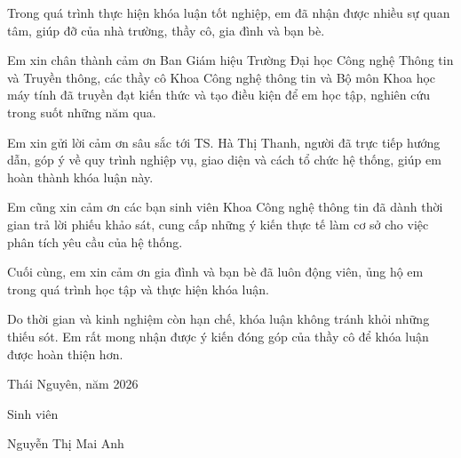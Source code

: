 \documentclass[../main.tex]{subfiles}
\begin{document}

Trong quá trình thực hiện khóa luận tốt nghiệp, em đã nhận được nhiều sự quan tâm, giúp đỡ của nhà trường, thầy cô, gia đình và bạn bè.

Em xin chân thành cảm ơn Ban Giám hiệu Trường Đại học Công nghệ Thông tin và Truyền thông, các thầy cô Khoa Công nghệ thông tin và Bộ môn Khoa học máy tính đã truyền đạt kiến thức và tạo điều kiện để em học tập, nghiên cứu trong suốt những năm qua.

Em xin gửi lời cảm ơn sâu sắc tới TS. Hà Thị Thanh, người đã trực tiếp hướng dẫn, góp ý về quy trình nghiệp vụ, giao diện và cách tổ chức hệ thống, giúp em hoàn thành khóa luận này.

Em cũng xin cảm ơn các bạn sinh viên Khoa Công nghệ thông tin đã dành thời gian trả lời phiếu khảo sát, cung cấp những ý kiến thực tế làm cơ sở cho việc phân tích yêu cầu của hệ thống.

Cuối cùng, em xin cảm ơn gia đình và bạn bè đã luôn động viên, ủng hộ em trong quá trình học tập và thực hiện khóa luận.

Do thời gian và kinh nghiệm còn hạn chế, khóa luận không tránh khỏi những thiếu sót. Em rất mong nhận được ý kiến đóng góp của thầy cô để khóa luận được hoàn thiện hơn.

\vspace{1cm}

\begin{flushright}
Thái Nguyên, năm 2026

Sinh viên

\vspace{2cm}

Nguyễn Thị Mai Anh
\end{flushright}
\end{document}
